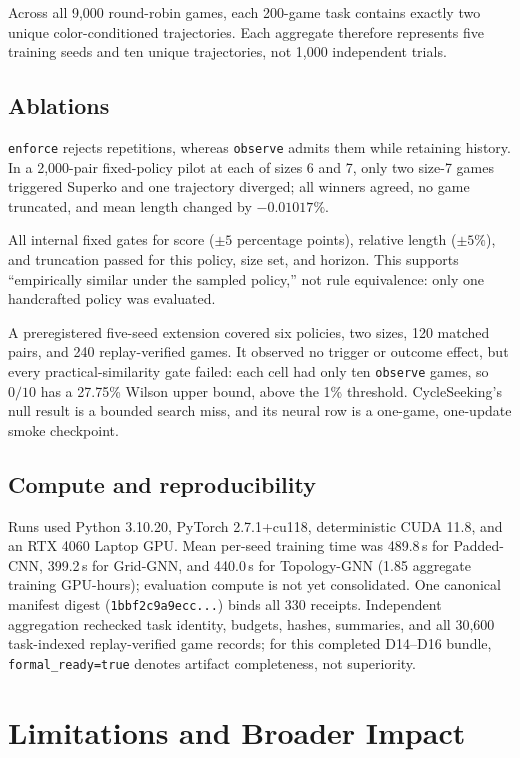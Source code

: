 \documentclass{article}
\begin{document}
Across all 9,000 round-robin games, each 200-game task contains exactly two
unique color-conditioned trajectories. Each aggregate therefore represents
five training seeds and ten unique trajectories, not 1,000 independent trials.

\subsection{Ablations}

\texttt{enforce} rejects repetitions, whereas \texttt{observe} admits them
while retaining history. In a 2,000-pair fixed-policy pilot at each of sizes 6
and 7, only two size-7 games triggered Superko and one trajectory diverged; all
winners agreed, no game truncated, and mean length changed by $-0.01017\%$.

All internal fixed gates for score ($\pm 5$ percentage points), relative length
($\pm 5\%$), and truncation passed for this policy, size set, and horizon. This
supports ``empirically similar under the sampled policy,'' not rule equivalence:
only one handcrafted policy was evaluated.

A preregistered five-seed extension covered six policies, two sizes, 120
matched pairs, and 240 replay-verified games. It observed no trigger or outcome
effect, but every practical-similarity gate failed: each cell had only ten
\texttt{observe} games, so $0/10$ has a 27.75\% Wilson upper bound, above the
1\% threshold. CycleSeeking's null result is a bounded search miss, and its
neural row is a one-game, one-update smoke checkpoint.

\subsection{Compute and reproducibility}

Runs used Python 3.10.20, PyTorch 2.7.1+cu118, deterministic CUDA 11.8, and an
RTX 4060 Laptop GPU. Mean per-seed training time was 489.8\,s for
\mbox{Padded-CNN}, 399.2\,s for \mbox{Grid-GNN}, and 440.0\,s for
\mbox{Topology-GNN} (1.85 aggregate training GPU-hours);
evaluation compute is not yet consolidated. One canonical manifest digest
(\texttt{1bbf2c9a9ecc...}) binds all 330 receipts. Independent aggregation
rechecked task identity, budgets, hashes, summaries, and all 30,600
task-indexed replay-verified game records;
for this completed D14--D16 bundle,
\texttt{formal\_ready=true} denotes artifact completeness, not superiority.

\section{Limitations and Broader Impact}
\label{sec:limitations}
\end{document}
